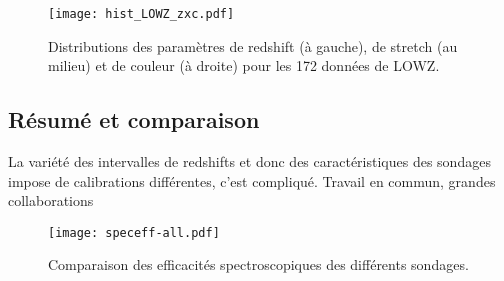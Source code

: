 \documentclass[../main/main.tex]{subfiles}
\begin{document}
\begin{figure}[h]
    \centering
    \texttt{[image: hist\_LOWZ\_zxc.pdf]}
    \captionsetup{justification=centering}
    \caption{Distributions des paramètres de redshift (à gauche), de stretch (au
    milieu) et de couleur (à droite) pour les 172 données de LOWZ.}
    \label{fig:lowzhist}
\end{figure}

\subsection{Résumé et comparaison}\label{ssec:sondcomp}

La variété des intervalles de redshifts et donc des caractéristiques des
sondages impose de calibrations différentes, c'est compliqué. Travail en commun,
grandes collaborations

\begin{SCfigure}[0.5][h!]
    \centering
    \texttt{[image: speceff-all.pdf]}
    \caption{Comparaison des efficacités spectroscopiques des différents
    sondages.}
    \label{fig:speceff}
\end{SCfigure}
\end{document}

